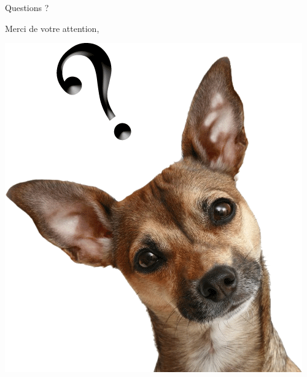 \documentclass{beamer}
\begin{document}
\begin{frame}{Questions ?}

  Merci de votre attention,
  \begin{center}
    \includegraphics[scale=0.25]{img/question}
  \end{center}
\end{frame}
\end{document}
